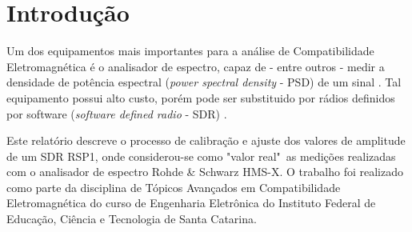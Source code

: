 \chapter{Introdução}
Um dos equipamentos mais importantes para a análise de Compatibilidade Eletromagnética é o analisador de espectro, capaz de - entre outros - medir a densidade de potência espectral (\textit{power spectral density} - PSD) de um sinal \cite{aulaSpirroEMC}. Tal equipamento possui alto custo, porém pode ser substituido por rádios definidos por software (\textit{software defined radio} - SDR) \cite{tccIgor}.

Este relatório descreve o processo de calibração e ajuste dos valores de amplitude de um SDR RSP1, onde considerou-se como "valor real"\  as medições realizadas com o analisador de espectro Rohde \& Schwarz HMS-X. O trabalho foi realizado como parte da disciplina de Tópicos Avançados em Compatibilidade Eletromagnética do curso de Engenharia Eletrônica do Instituto Federal de Educação, Ciência e Tecnologia de Santa Catarina.
